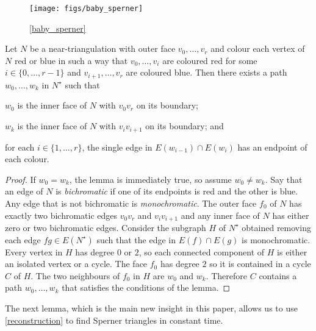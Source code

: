 \documentclass{patmorin}
\begin{document}
\begin{figure}
  \begin{center}
    \texttt{[image: figs/baby\_sperner]}
  \end{center}
  \caption{\cref{baby_sperner}}
  \label{baby_sperner_fig}
\end{figure}

\begin{lem}\label{baby_sperner}
  Let $N$ be a near-triangulation with outer face $v_0,\ldots,v_r$ and colour each vertex of $N$ red or blue in such a way that $v_0,\ldots,v_i$ are coloured red for some $i\in\{0,\ldots,r-1\}$ and $v_{i+1},\ldots,v_r$ are coloured blue.  Then there exists a path $w_0,\ldots,w_k$ in $N^\star$ such that
  \begin{compactenum}
    \item $w_0$ is the inner face of $N$ with $v_0v_r$ on its boundary;
    \item $w_k$ is the inner face of $N$ with $v_iv_{i+1}$ on its boundary; and
    \item for each $i\in\{1,\ldots,r\}$, the single edge in $E(w_{i-1})\cap E(w_i)$ has an endpoint of each colour.
  \end{compactenum}
\end{lem}

\begin{proof}
  If $w_0=w_k$, the lemma is immediately true, so assume $w_0\neq w_k$.
  Say that an edge of $N$ is \emph{bichromatic} if one of its endpoints is red and the other is blue.  Any edge that is not bichromatic is \emph{monochromatic}.  The outer face $f_0$ of $N$ has exactly two bichromatic edges $v_0v_r$ and $v_iv_{i+1}$ and any inner face of $N$ has either zero or two bichromatic edges.  Consider the subgraph $H$ of $N^\star$ obtained removing each edge $fg\in E(N^\star)$ such that the edge in $E(f)\cap E(g)$ is monochromatic.  Every vertex in $H$ has degree $0$ or $2$, so each connected component of $H$ is either an isolated vertex or a cycle.  The face $f_0$ has degree $2$ so it is contained in a cycle $C$ of $H$.  The two neighbours of $f_0$ in $H$ are $w_0$ and $w_k$. Therefore $C$ contains a path $w_0,\ldots,w_k$ that satisfies the conditions of the lemma.
\end{proof}

The next lemma, which is the main new insight in this paper, allows us to use \cref{reconstruction} to find Sperner triangles in constant time.
\end{document}
